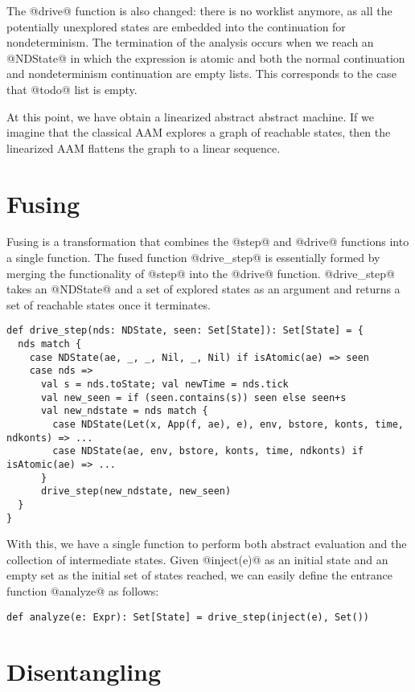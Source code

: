 \documentclass[acmsmall]{acmart}\settopmatter{}
\begin{document}
The @drive@ function is also changed: there is no worklist anymore, as all the
potentially unexplored states are embedded into the continuation for
nondeterminism.
The termination of the analysis occurs when we reach an @NDState@ in which the expression
is atomic and both the normal continuation and nondeterminism continuation are
empty lists. This corresponds to the case that @todo@ list is empty.

At this point, we have obtain a linearized abstract abstract machine. If we imagine that the
classical AAM explores a graph of reachable states, then the linearized AAM flattens the
graph to a linear sequence.

\section{Fusing} \label{fusing}

Fusing is a transformation that combines the @step@ and @drive@ functions into a single
function.
The fused function @drive_step@ is essentially formed by merging the functionality of
@step@ into the @drive@ function.
@drive_step@ takes an @NDState@ and a set of explored states as an argument
and returns a set of reachable states once it terminates.

\begin{lstlisting}
def drive_step(nds: NDState, seen: Set[State]): Set[State] = {
  nds match {
    case NDState(ae, _, _, Nil, _, Nil) if isAtomic(ae) => seen
    case nds =>
      val s = nds.toState; val newTime = nds.tick
      val new_seen = if (seen.contains(s)) seen else seen+s
      val new_ndstate = nds match {
        case NDState(Let(x, App(f, ae), e), env, bstore, konts, time, ndkonts) => ...
        case NDState(ae, env, bstore, konts, time, ndkonts) if isAtomic(ae) => ...
      }
      drive_step(new_ndstate, new_seen)
  }
}
\end{lstlisting}

With this, we have a single function to perform both abstract evaluation and the collection of
intermediate states. Given @inject(e)@ as an initial state and an empty set as the
initial set of states reached, we can easily define the entrance function @analyze@ as
follows:

\begin{lstlisting}
def analyze(e: Expr): Set[State] = drive_step(inject(e), Set())
\end{lstlisting}

\section{Disentangling} \label{disen}
\end{document}
